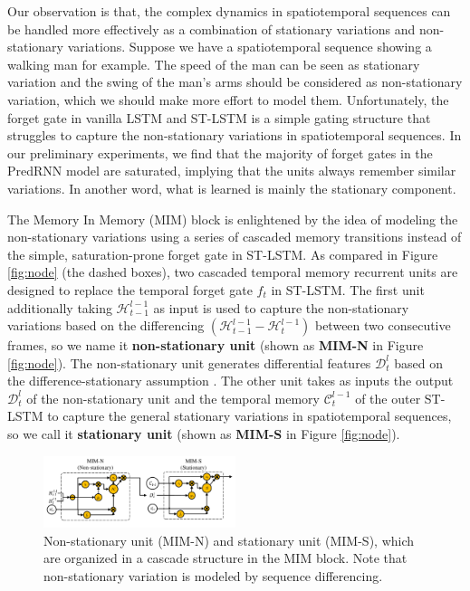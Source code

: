 \documentclass[10pt,twocolumn,letterpaper]{article}
\begin{document}
Our observation is that, the complex dynamics in spatiotemporal sequences can be handled more effectively as a combination of stationary variations and non-stationary variations. Suppose we have a spatiotemporal sequence showing a walking man for example. The speed of the man can be seen as stationary variation and the swing of the man's arms should be considered as non-stationary variation, which we should make more effort to model them. Unfortunately, the forget gate in vanilla LSTM and ST-LSTM is a simple gating structure that struggles to capture the non-stationary variations in spatiotemporal sequences. In our preliminary experiments, we find that the majority of forget gates in the PredRNN model \citep{wang2017predrnn} are saturated, implying that the units always remember similar variations. In another word, what is learned is mainly the stationary component. 

The Memory In Memory (MIM) block is enlightened by the idea of modeling the non-stationary variations using a series of cascaded memory transitions instead of the simple, saturation-prone forget gate in ST-LSTM. As compared in Figure \ref{fig:node} (the dashed boxes), two cascaded temporal memory recurrent units are designed to replace the temporal forget gate $f_t$ in ST-LSTM. The first unit additionally taking $\mathcal{H}_{t-1}^{l-1}$ as input is used to capture the non-stationary variations based on the differencing $(\mathcal{H}_{t-1}^{l-1} - \mathcal{H}_t^{l-1})$ between two consecutive frames, so we name it \textbf{non-stationary unit} (shown as \textbf{MIM-N} in Figure \ref{fig:node}). The non-stationary unit generates differential features $\mathcal{D}_t^l$ based on the difference-stationary assumption \citep{percival1993spectral}. 
The other unit takes as inputs the output $\mathcal{D}_t^l$ of the non-stationary unit and the temporal memory $\mathcal{C}_{t}^{l-1}$ of the outer ST-LSTM to capture the general stationary variations in spatiotemporal sequences, so we call it \textbf{stationary unit} (shown as \textbf{MIM-S} in Figure \ref{fig:node}). 

\begin{figure}[h]
  \centering
  \includegraphics[width=0.5\textwidth]{fig/units.pdf}
  \caption{Non-stationary unit (MIM-N) and stationary unit (MIM-S), which are organized in a cascade structure in the MIM block. Note that non-stationary variation is modeled by sequence differencing.}
  \label{fig:subunits}
\end{figure}
\end{document}
